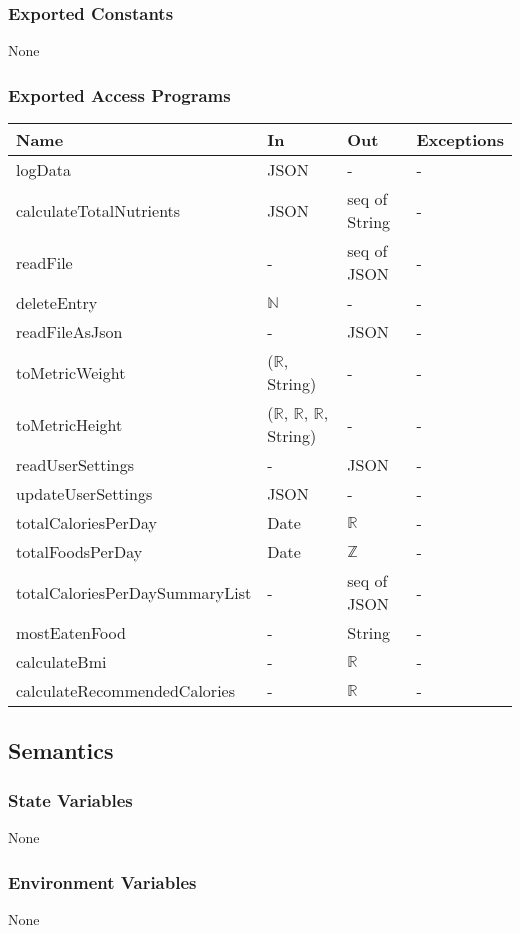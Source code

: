 \documentclass[12pt, titlepage]{article}
\begin{document}
\subsubsection{Exported Constants}
None
\subsubsection{Exported Access Programs}
\begin{center}
	\begin{tabular}{p{6.2cm} p{3.7cm} p{2.5cm} p{2cm}}
		\hline
		\textbf{Name} & \textbf{In} & \textbf{Out} & \textbf{Exceptions} \\
		\hline
		
		logData & JSON  & - & - \\
		calculateTotalNutrients & JSON  & seq of String & - \\
		readFile & -  & seq of JSON & - \\
		deleteEntry & $\mathbb{N}$ &- &- \\
		readFileAsJson & -  & JSON & - \\
		toMetricWeight & ($\mathbb{R}$, String) &- &-\\
		toMetricHeight & ($\mathbb{R}$, $\mathbb{R}$, $\mathbb{R}$,  String) &- 
		&-\\
		readUserSettings &- & JSON &-\\
		updateUserSettings & JSON & - &-\\
		totalCaloriesPerDay & Date  & $\mathbb{R}$ & - \\
		totalFoodsPerDay & Date  & $\mathbb{Z}$ & - \\
		totalCaloriesPerDaySummaryList & -  & seq of JSON & - \\
		mostEatenFood & -  & String & - \\
		calculateBmi &- & $\mathbb{R}$ &-\\
		calculateRecommendedCalories &- & $\mathbb{R}$ &-\\
		\hline
	\end{tabular}
\end{center}
\subsection{Semantics}
\subsubsection{State Variables}
None
\subsubsection{Environment Variables}
None
\end{document}
